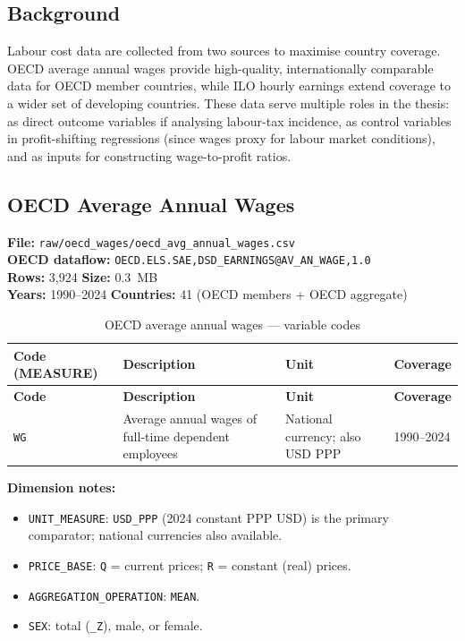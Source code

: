\documentclass[11pt,a4paper]{article}
\begin{document}
\subsection{Background}
\label{subsec:wages_background}

Labour cost data are collected from two sources to maximise country coverage.
OECD average annual wages provide high-quality, internationally comparable
data for OECD member countries, while ILO hourly earnings extend coverage to
a wider set of developing countries.  These data serve multiple roles in the
thesis: as direct outcome variables if analysing labour-tax incidence, as
control variables in profit-shifting regressions (since wages proxy for labour
market conditions), and as inputs for constructing wage-to-profit ratios.

\subsection{OECD Average Annual Wages}
\label{subsec:oecd_wages}

\textbf{File:} \texttt{raw/oecd\_wages/oecd\_avg\_annual\_wages.csv}\\
\textbf{OECD dataflow:} \texttt{OECD.ELS.SAE,DSD\_EARNINGS@AV\_AN\_WAGE,1.0}\\
\textbf{Rows:} 3{,}924 \quad \textbf{Size:} 0.3~MB\\
\textbf{Years:} 1990--2024 \quad \textbf{Countries:} 41 (OECD members + OECD aggregate)

\begin{longtable}{L{2.4cm} L{5.5cm} C{2.2cm} C{2.5cm}}
    \caption{OECD average annual wages --- variable codes}
    \label{tab:oecd_wages}\\
    \toprule
    \textbf{Code (MEASURE)} & \textbf{Description} & \textbf{Unit} & \textbf{Coverage} \\
    \midrule
    \endfirsthead
    \toprule
    \textbf{Code} & \textbf{Description} & \textbf{Unit} & \textbf{Coverage} \\
    \midrule
    \endhead
    \bottomrule
    \endlastfoot
    \texttt{WG} & Average annual wages of full-time dependent employees & National currency; also USD PPP & 1990--2024 \\
\end{longtable}

\noindent\textbf{Dimension notes:}
\begin{itemize}[noitemsep]
    \item \texttt{UNIT\_MEASURE}: \texttt{USD\_PPP} (2024 constant PPP USD) is the
    primary comparator; national currencies also available.
    \item \texttt{PRICE\_BASE}: \texttt{Q} = current prices; \texttt{R} = constant
    (real) prices.
    \item \texttt{AGGREGATION\_OPERATION}: \texttt{MEAN}.
    \item \texttt{SEX}: total (\texttt{\_Z}), male, or female.
\end{itemize}
\end{document}
